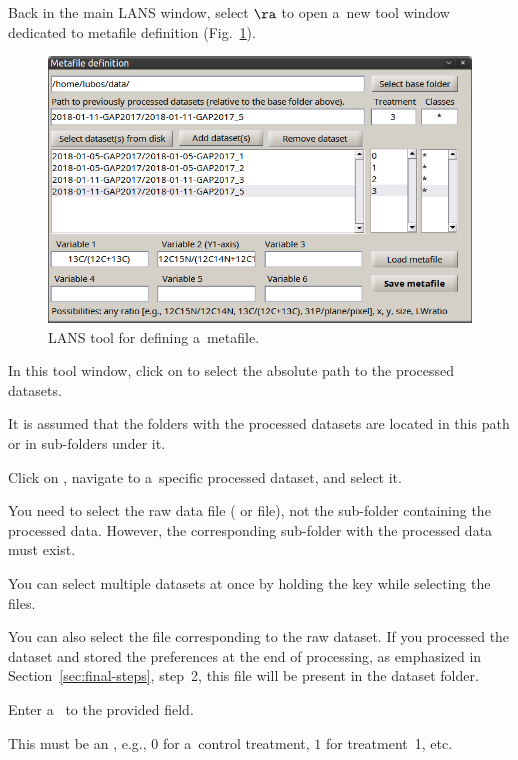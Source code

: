 \s Back in the main LANS window, select  $\ra$  to open a~new tool window dedicated to metafile definition (Fig.~\ref{fig:metafile-definition}). 

\begin{figure}[!ht]
\centering
\includegraphics[scale=0.4]{figs3/LANS-metafile-definition}
\caption{\label{fig:metafile-definition}%
LANS tool for defining a~metafile.}
\end{figure}

\s In this tool window, click on  to select the absolute path to the processed datasets.

\bul It is assumed that the folders with the processed datasets are located in this path or in sub-folders under it.

\s Click on , navigate to a~specific processed dataset, and select it.

\bul You need to select the raw data file ( or  file), not the sub-folder containing the processed data. However, the corresponding sub-folder with the processed data must exist.

\bul You can select multiple datasets at once by holding the  key while selecting the files.

\bul You can also select the  file corresponding to the raw dataset. If you processed the dataset and stored the preferences at the end of processing, as emphasized in Section~\ref{sec:final-steps}, step~2, this file will be present in the dataset folder.

\s Enter a~ to the provided field.

\bul This must be an , e.g., $0$ for a~control treatment, $1$ for treatment~1, etc.


